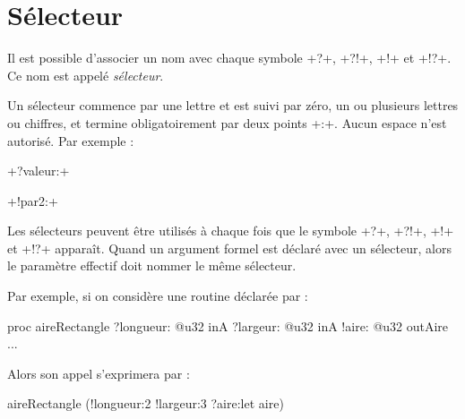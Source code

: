 








\section{Sélecteur}

Il est possible d'associer un nom avec chaque symbole \ggsq+?+, \ggsq+?!+, \ggsq+!+ et \ggsq+!?+. Ce nom est appelé \emph{sélecteur}.

Un sélecteur commence par une lettre et est suivi par zéro, un ou plusieurs lettres ou chiffres, et termine obligatoirement par deux points \ggsq+:+. Aucun espace n'est autorisé. Par exemple :

\ggsq+?valeur:+

\ggsq+!par2:+

Les sélecteurs peuvent être utilisés à chaque fois que le symbole \ggsq+?+, \ggsq+?!+, \ggsq+!+ et \ggsq+!?+ apparaît. Quand un argument formel est déclaré avec un sélecteur, alors le paramètre effectif doit nommer le même sélecteur.

Par exemple, si on considère une routine déclarée par :

\begin{galgas4}
proc aireRectangle
  ?longueur: @u32 inA
  ?largeur: @u32 inA
  !aire: @u32 outAire
{
  ...
}
\end{galgas4}

Alors son appel s'exprimera par :
\begin{galgas4}
  aireRectangle (!longueur:2 !largeur:3 ?aire:let aire)
\end{galgas4}


